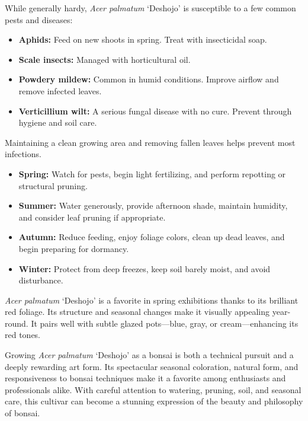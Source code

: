 \medskip
{}
\noindent
While generally hardy, \textit{Acer palmatum} ‘Deshojo’ is susceptible to a few common pests and diseases:

\begin{itemize}
    \item \textbf{Aphids:} Feed on new shoots in spring. Treat with insecticidal soap.
    \item \textbf{Scale insects:} Managed with horticultural oil.
    \item \textbf{Powdery mildew:} Common in humid conditions. Improve airflow and remove infected leaves.
    \item \textbf{Verticillium wilt:} A serious fungal disease with no cure. Prevent through hygiene and soil care.
\end{itemize}

Maintaining a clean growing area and removing fallen leaves helps prevent most infections.

\medskip
{}
\noindent
\begin{itemize}
    \item \textbf{Spring:} Watch for pests, begin light fertilizing, and perform repotting or structural pruning.
    \item \textbf{Summer:} Water generously, provide afternoon shade, maintain humidity, and consider leaf pruning if appropriate.
    \item \textbf{Autumn:} Reduce feeding, enjoy foliage colors, clean up dead leaves, and begin preparing for dormancy.
    \item \textbf{Winter:} Protect from deep freezes, keep soil barely moist, and avoid disturbance.
\end{itemize}

\medskip
{}
\noindent
\textit{Acer palmatum} ‘Deshojo’ is a favorite in spring exhibitions thanks to its brilliant red foliage. Its structure and seasonal changes make it visually appealing year-round. It pairs well with subtle glazed pots—blue, gray, or cream—enhancing its red tones.

\medskip
{}
\noindent
Growing \textit{Acer palmatum} ‘Deshojo’ as a bonsai is both a technical pursuit and a deeply rewarding art form. Its spectacular seasonal coloration, natural form, and responsiveness to bonsai techniques make it a favorite among enthusiasts and professionals alike. With careful attention to watering, pruning, soil, and seasonal care, this cultivar can become a stunning expression of the beauty and philosophy of bonsai.

\closearticle 

